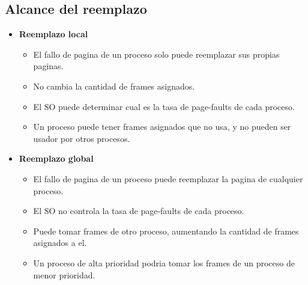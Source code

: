 \documentclass[12pt]{article}
\begin{document}
\subsection{Alcance del reemplazo}
\begin{itemize}
    \item \textbf{Reemplazo local}
        \begin{itemize}
            \item El fallo de pagina de un proceso solo puede reemplazar sus propias paginas.
            \item No cambia la cantidad de frames asignados.
            \item El SO puede determinar cual es la tasa de page-faults de cada proceso.
            \item Un proceso puede tener frames asignados que no usa, y no pueden ser usador por otros procesos.
        \end{itemize}
        \item \textbf{Reemplazo global}
            \begin{itemize}
                \item El fallo de pagina de un proceso puede reemplazar la pagina de cualquier proceso.
                \item El SO no controla la tasa de page-faults de cada proceso.
                \item Puede tomar frames de otro proceso, aumentando la cantidad de frames asignados a el.
                \item Un proceso de alta prioridad podria tomar los frames de un proceso de menor prioridad.
            \end{itemize}
\end{itemize}
\end{document}
